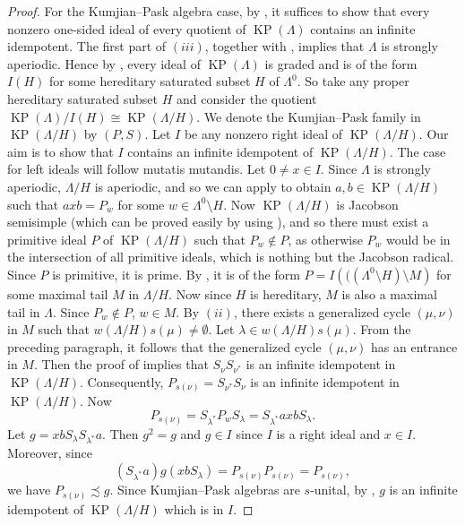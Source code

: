 \documentclass[a4paper,reqno,12pt]{amsart}
\numberwithin{equation}{section}
\theoremstyle{definition}
\theoremstyle{remark}
\newcommand{\KP}{\operatorname{KP}}
\begin{document}
\begin{proof}
For the Kumjian--Pask algebra case, by \cite[Theorems 3.4 and 4.2]{LPIS2}, it suffices to show that every nonzero one-sided ideal of every quotient of $\KP(\Lambda)$ contains an infinite idempotent. The first part of $(iii)$, together with \cite[Theorem 5.11]{HMPS1}, implies that $\Lambda$ is strongly aperiodic. Hence by \cite[Theorem 5.6]{Pino}, every ideal of $\KP(\Lambda)$ is graded and is of the form $I(H)$ for some hereditary saturated subset $H$ of $\Lambda^0$. So take any proper hereditary saturated subset $H$ and consider the quotient $\KP(\Lambda)/I(H)\cong \KP(\Lambda/H)$. We denote the Kumjian--Pask family in $\KP(\Lambda/H)$ by $(P,S)$. Let $I$ be any nonzero right ideal of $\KP(\Lambda/H)$. Our aim is to show that $I$ contains an infinite idempotent of $\KP(\Lambda/H)$. The case for left ideals will follow mutatis mutandis. Let $0\neq x\in I$. Since $\Lambda$ is strongly aperiodic, $\Lambda/H$ is aperiodic, and so we can apply \cite[Proposition 4.9]{Pino} to obtain $a,b\in \KP(\Lambda/H)$ such that $a xb=P_w$ for some $w\in \Lambda^0\setminus H$. Now $\KP(\Lambda/H)$ is Jacobson semisimple (which can be proved easily by using \cite[Proposition 4.9]{Pino}), and so there must exist a primitive ideal $P$ of $\KP(\Lambda/H)$ such that $P_w\notin P$, as otherwise $P_w$ would be in the intersection of all primitive ideals, which is nothing but the Jacobson radical. Since $P$ is primitive, it is prime. By \cite[Proposition 4.1]{Larki}, it is of the form $P=I\left(((\Lambda^0\setminus H)\setminus M\right)$ for some maximal tail $M$ in $\Lambda/H$. Now since $H$ is hereditary, $M$ is also a maximal tail in $\Lambda$. Since $P_w\notin P$, $w\in M$. By $(ii)$, there exists a generalized cycle $(\mu,\nu)$ in $M$ such that $w(\Lambda/H)s(\mu)\neq \emptyset$. Let $\lambda\in w(\Lambda/H)s(\mu)$. From the preceding paragraph, it follows that the generalized cycle $(\mu,\nu)$ has an entrance in $M$. Then the proof of \cite[Proposition 4.2.7]{HLM} implies that $S_\nu S_{\nu^*}$ is an infinite idempotent in $\KP(\Lambda/H)$. Consequently, $P_{s(\nu)}=S_{\nu^*}S_\nu$ is an infinite idempotent in $\KP(\Lambda/H)$. Now \[P_{s(\nu)}=S_{\lambda^*}P_wS_\lambda=S_{\lambda^*} a x b S_\lambda.\] Let $g=xbS_{\lambda}S_{\lambda^*}a$. Then $g^2=g$ and $g\in I$ since $I$ is a right ideal and $x\in I$. Moreover, since \[(S_{\lambda^*}a)g(xbS_{\lambda})=P_{s(\nu)}P_{s(\nu)}=P_{s(\nu)},\] we have $P_{s(\nu)}\precsim g$. Since Kumjian--Pask algebras are $s$-unital, by \cite[Lemma 3.9$(iii)$]{AGPM}, $g$ is an infinite idempotent of $\KP(\Lambda/H)$ which is in $I$. 
\end{proof}
\end{document}
